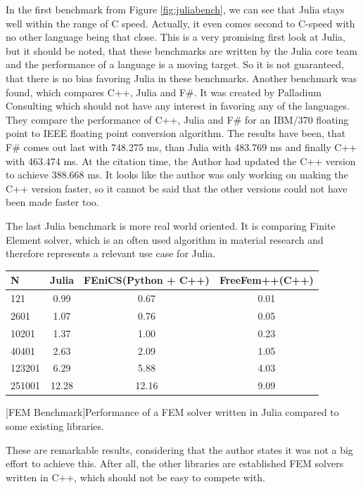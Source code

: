 In the first benchmark from Figure \ref{fig:juliabench}, we can see that Julia stays well within the range of C speed. 
Actually, it even comes second to C-speed with no other language being that close.
This is a very promising first look at Julia, but it should be noted, that these benchmarks are written by the Julia core team and the performance of a language is a moving target.
So it is not guaranteed, that there is no bias favoring Julia in these benchmarks.
Another benchmark was found, which compares C++, Julia and F\#. It was created by Palladium Consulting\cite{PalladiumConsulting} which should not have any interest in favoring any of the languages.
They compare the performance of C++, Julia and F\# for an IBM/370 floating point to IEEE floating point conversion algorithm.
The results\cite{JuliaFSCpp} have been, that F\# comes out last with 748.275 ms, than Julia with 483.769 ms and finally C++ with 463.474 ms. 
At the citation time, the Author had updated the C++ version to achieve 388.668 ms. 
It looks like the author was only working on making the C++ version faster, so it cannot be said that the other versions could not have been made faster too.

The last Julia benchmark is more real world oriented. 
It is comparing Finite Element solver, which is an often used algorithm in material research and therefore represents a relevant use case for Julia.

\begin{table}[htbp]
    \centering
    \begin{tabular}{l|c|c|c}
        \hline
        \textbf{N}  & \textbf{Julia} & \textbf{FEniCS(Python + C++)}  & \textbf{FreeFem++(C++)}\\
        \hline
        121         & 0.99           & 0.67             & 0.01 \\
        2601        & 1.07           & 0.76             & 0.05 \\
        10201       & 1.37           & 1.00             & 0.23 \\
        40401       & 2.63           & 2.09             & 1.05 \\
        123201      & 6.29           & 5.88             & 4.03 \\
        251001      & 12.28          & 12.16            & 9.09 \\
        \hline
    \end{tabular}
    [FEM Benchmark]{Performance of a FEM solver written in Julia compared to some existing libraries. \cite{FMSolver}}
    \label{table:fembench}
\end{table}
These are remarkable results, considering that the author states it was not a big effort to achieve this. After all, the other libraries are established FEM solvers written in C++, which should not be easy to compete with.

